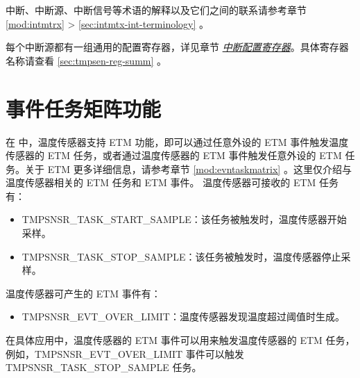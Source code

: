 \documentclass[main\_\_CN.tex]{subfiles}
\begin{document}
\begin{tiplisting}
中断、中断源、中断信号等术语的解释以及它们之间的联系请参考章节 \ref{mod:intmtrx} \textit{} > \ref{sec:intmtx-int-terminology} \textit{}。
\end{tiplisting}

每个中断源都有一组通用的配置寄存器，详见章节 \hyperref[interrupt-config-registers]{\textit{中断配置寄存器}}。具体寄存器名称请查看 \ref{sec:tmpsen-reg-summ} \textit{}。


\section{事件任务矩阵功能}
\label{sec:tmpsen-etm-func}

在 \chipname{} 中，温度传感器支持 ETM 功能，即可以通过任意外设的 ETM 事件触发温度传感器的 ETM 任务，或者通过温度传感器的 ETM 事件触发任意外设的 ETM 任务。关于 ETM 更多详细信息，请参考章节 \ref{mod:evntaskmatrix} \textit{}。这里仅介绍与温度传感器相关的 ETM 任务和 ETM 事件。
温度传感器可接收的 ETM 任务有：

\begin{itemize}
    \item TMPSNSR\_TASK\_START\_SAMPLE：该任务被触发时，温度传感器开始采样。
    \item TMPSNSR\_TASK\_STOP\_SAMPLE：该任务被触发时，温度传感器停止采样。
\end{itemize}

温度传感器可产生的 ETM 事件有：

\begin{itemize}
    \item TMPSNSR\_EVT\_OVER\_LIMIT：温度传感器发现温度超过阈值时生成。
\end{itemize}

在具体应用中，温度传感器的 ETM 事件可以用来触发温度传感器的 ETM 任务，例如，TMPSNSR\_EVT\_OVER\_LIMIT 事件可以触发 TMPSNSR\_TASK\_STOP\_SAMPLE 任务。



\end{document}
